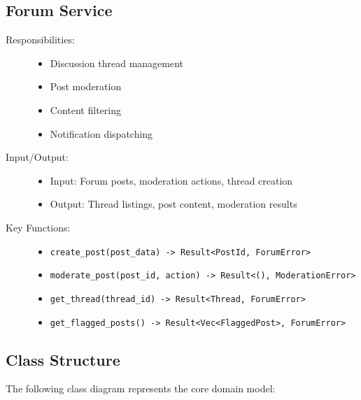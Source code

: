 \documentclass[a4paper, 11pt]{scrreprt}
\begin{document}
\subsection{Forum Service}
\begin{description}
    \item[Responsibilities:]
    \begin{itemize}
        \item Discussion thread management
        \item Post moderation
        \item Content filtering
        \item Notification dispatching
    \end{itemize}
    
    \item[Input/Output:]
    \begin{itemize}
        \item Input: Forum posts, moderation actions, thread creation
        \item Output: Thread listings, post content, moderation results
    \end{itemize}
    
    \item[Key Functions:]
    \begin{itemize}
        \item \texttt{create\_post(post\_data) -> Result<PostId, ForumError>}
        \item \texttt{moderate\_post(post\_id, action) -> Result<(), ModerationError>}
        \item \texttt{get\_thread(thread\_id) -> Result<Thread, ForumError>}
        \item \texttt{get\_flagged\_posts() -> Result<Vec<FlaggedPost>, ForumError>}
    \end{itemize}
\end{description}

\subsection{Class Structure}
The following class diagram represents the core domain model:
\end{document}
